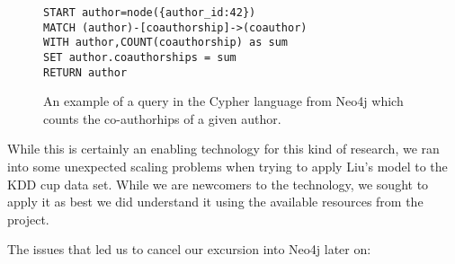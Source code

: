 \begin{figure}[htb]
\centering
\begin{verbatim}
START author=node({author_id:42})
MATCH (author)-[coauthorship]->(coauthor)
WITH author,COUNT(coauthorship) as sum
SET author.coauthorships = sum
RETURN author
\end{verbatim}
\caption{An example of a query in the Cypher language from Neo4j which counts the co-authorhips of a given author.}
\label{fig:cypher}
\end{figure}

While this is certainly an enabling technology for this kind of research, we ran into some unexpected scaling problems when trying to apply Liu's model to the KDD cup data set.
While we are newcomers to the technology, we sought to apply it as best we did understand it using the available resources from the project.

The issues that led us to cancel our excursion into Neo4j later on:

